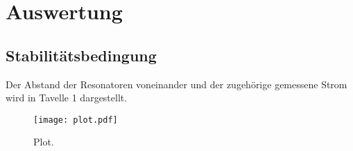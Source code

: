 \section{Auswertung}
\label{sec:Auswertung}


\subsection{Stabilitätsbedingung}
Der Abstand der Resonatoren voneinander und der zugehörige gemessene Strom wird in Tavelle 1 dargestellt. 

\begin{figure}
  \centering
  \texttt{[image: plot.pdf]}
  \caption{Plot.}
  \label{fig:plot}
\end{figure}
